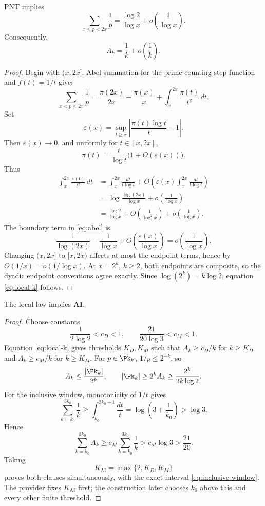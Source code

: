 \begin{proposition}\label{prop:local-law}
PNT implies
\begin{equation}\label{eq:local-x}
 \sum_{x\le p<2x}\frac1p
 =\frac{\log2}{\log x}
  +o\!\left(\frac1{\log x}\right).
\end{equation}
Consequently,
\begin{equation}\label{eq:local-k}
 A_k=\frac1k+o\!\left(\frac1k\right).
\end{equation}
\end{proposition}
\begin{proof}
Begin with $(x,2x]$.  Abel summation for the prime-counting step function and
$f(t)=1/t$ gives
\begin{equation}\label{eq:abel}
 \sum_{x<p\le2x}\frac1p
 =\frac{\pi(2x)}{2x}-\frac{\pi(x)}x
  +\int_x^{2x}\frac{\pi(t)}{t^2}\,dt.
\end{equation}
Set
\[
 \varepsilon(x)=\sup_{t\ge x}
 \left|\frac{\pi(t)\log t}{t}-1\right|.
\]
Then $\varepsilon(x)\to0$, and uniformly for $t\in[x,2x]$,
\[
 \pi(t)=\frac{t}{\log t}\bigl(1+O(\varepsilon(x))\bigr).
\]
Thus
\begin{align*}
 \int_x^{2x}\frac{\pi(t)}{t^2}\,dt
 &=\int_x^{2x}\frac{dt}{t\log t}
   +O\!\left(\varepsilon(x)
             \int_x^{2x}\frac{dt}{t\log t}\right)\\
 &=\log\frac{\log(2x)}{\log x}
   +o\!\left(\frac1{\log x}\right)\\
 &=\frac{\log2}{\log x}
   +O\!\left(\frac1{\log^2x}\right)
   +o\!\left(\frac1{\log x}\right).
\end{align*}
The boundary term in \eqref{eq:abel} is
\[
 \frac1{\log(2x)}-\frac1{\log x}
 +O\!\left(\frac{\varepsilon(x)}{\log x}\right)
 =o\!\left(\frac1{\log x}\right).
\]
Changing $(x,2x]$ to $[x,2x)$ affects at most the endpoint terms, hence by
$O(1/x)=o(1/\log x)$.  At $x=2^k$, $k\ge2$, both endpoints are composite, so
the dyadic endpoint conventions agree exactly.  Since
$\log(2^k)=k\log2$, equation \eqref{eq:local-k} follows.
\end{proof}

\begin{proposition}\label{prop:PNT-AI}
The local law implies $\mathbf{AI}$.
\end{proposition}
\begin{proof}
Choose constants
\[
 \frac1{2\log2}<c_D<1,
 \qquad
 \frac{21}{20\log3}<c_M<1.
\]
Equation \eqref{eq:local-k} gives thresholds $K_D,K_M$ such that
$A_k\ge c_D/k$ for $k\ge K_D$ and $A_k\ge c_M/k$ for $k\ge K_M$.
For $p\in\Pk_k$, $1/p\le2^{-k}$, so
\[
 A_k\le\frac{|\Pk_k|}{2^k},
 \qquad
 |\Pk_k|\ge2^kA_k
 \ge\frac{2^k}{2k\log2}.
\]
For the inclusive window, monotonicity of $1/t$ gives
\[
 \sum_{k=k_0}^{3k_0}\frac1k
 \ge\int_{k_0}^{3k_0+1}\frac{dt}{t}
 =\log\!\left(3+\frac1{k_0}\right)>\log3.
\]
Hence
\[
 \sum_{k=k_0}^{3k_0}A_k
 \ge c_M\sum_{k=k_0}^{3k_0}\frac1k
 >c_M\log3>\frac{21}{20}.
\]
Taking
\[
 K_{\mathrm{AI}}=\max\{2,K_D,K_M\}
\]
proves both clauses simultaneously, with the exact interval
\eqref{eq:inclusive-window}.  The provider fixes $K_{\mathrm{AI}}$ first; the
construction later chooses $k_0$ above this and every other finite threshold.
\end{proof}

